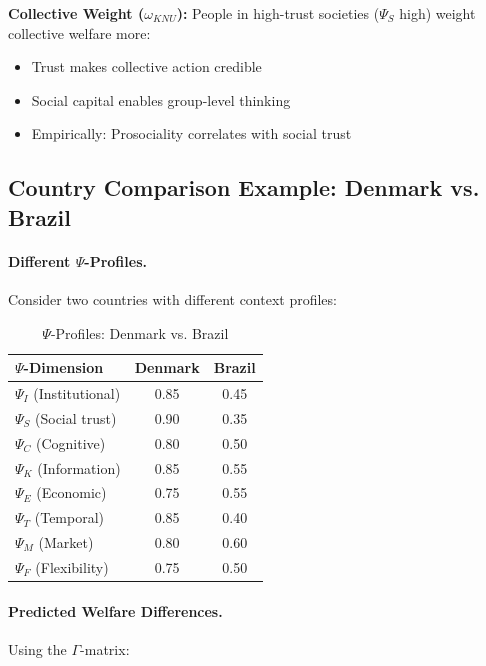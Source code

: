 \textbf{Collective Weight ($\omega_{KNU}$):}
People in high-trust societies ($\Psi_S$ high) weight collective welfare more:
\begin{itemize}
\item Trust makes collective action credible
\item Social capital enables group-level thinking
\item Empirically: Prosociality correlates with social trust
\end{itemize}

\subsection{Country Comparison Example: Denmark vs. Brazil}

\paragraph{Different $\Psi$-Profiles.}
Consider two countries with different context profiles:

\begin{table}[htbp]
\centering
\caption{$\Psi$-Profiles: Denmark vs. Brazil}
\label{tab:app-c-denmark-brazil-psi}
\renewcommand{\arraystretch}{1.3}
\begin{tabular}{@{}lcc@{}}
\toprule
\textbf{$\Psi$-Dimension} & \textbf{Denmark} & \textbf{Brazil} \\
\midrule
$\Psi_I$ (Institutional) & 0.85 & 0.45 \\
$\Psi_S$ (Social trust) & 0.90 & 0.35 \\
$\Psi_C$ (Cognitive) & 0.80 & 0.50 \\
$\Psi_K$ (Information) & 0.85 & 0.55 \\
$\Psi_E$ (Economic) & 0.75 & 0.55 \\
$\Psi_T$ (Temporal) & 0.85 & 0.40 \\
$\Psi_M$ (Market) & 0.80 & 0.60 \\
$\Psi_F$ (Flexibility) & 0.75 & 0.50 \\
\bottomrule
\end{tabular}
\end{table}

\paragraph{Predicted Welfare Differences.}
Using the $\Gamma$-matrix:

